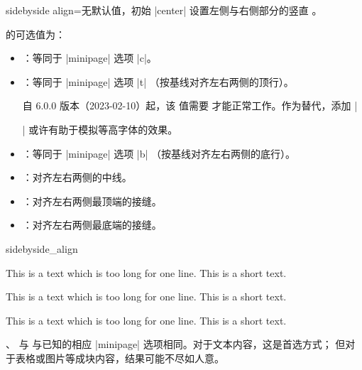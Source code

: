 \clearpage
\begin{docTcbKey}[][doc updated=2024-11-26]{sidebyside align}{=}{无默认值，初始 |center|}
  设置左侧与右侧部分的竖直 。

  的可选值为：
  \begin{itemize}
  \item{}：等同于 |minipage| 选项 |c|。
  \item{}：等同于 |minipage| 选项 |t|
    （按基线对齐左右两侧的顶行）。
    \begin{marker}
    自 6.0.0 版本（2023-02-10）起，该 值需要 
    才能正常工作。作为替代，添加 |\strut| 或许有助于模拟等高字体的效果。
    \end{marker}
  \item{}：等同于 |minipage| 选项 |b|
    （按基线对齐左右两侧的底行）。
  \item{}：对齐左右两侧的中线。
  \item{}：对齐左右两侧最顶端的接缝。
  \item{}：对齐左右两侧最底端的接缝。
  \end{itemize}

\begin{exdispExample}{sidebyside_align}

\begin{tcolorbox}[adjusted title=center,sidebyside align=center]
This is a text which is too long for one line.
\tcblower
This is a short text.
\end{tcolorbox}\hfill
\begin{tcolorbox}[adjusted title=top,sidebyside align=top]
This is a text which is too long for one line.
\tcblower
This is a short text.
\end{tcolorbox}\hfill
\begin{tcolorbox}[adjusted title=bottom,sidebyside align=bottom]
This is a text which is too long for one line.
\tcblower
This is a short text.
\end{tcolorbox}
\end{exdispExample}


、 与 
与已知的相应 |minipage| 选项相同。对于文本内容，这是首选方式；
但对于表格或图片等成块内容，结果可能不尽如人意。


\end{docTcbKey}
